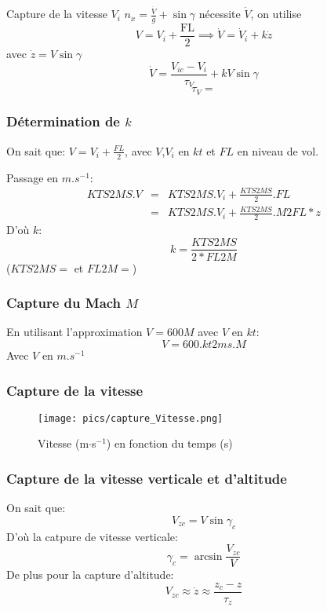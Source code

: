\documentclass[tikz, footheight=2em]{beamer}
\begin{document}
\begin{frame}{Capture de la vitesse \( V_i \)} \pause{}
    \(n_x = \frac{\dot{V}}{g} + \sin \gamma \) \pause{} n\'ecessite \(\dot{V}\),
    on utilise
    \[
    V = V_i + \frac{\text{FL}}{2} \implies \dot{V} = \dot{V}_i + k\dot{z}
    \]
    \pause{}
    avec \( \dot{z} = V\sin \gamma \)
    \[
    \dot{V} = \frac{V_{ic} - V_i}{\tau_V} + kV\sin \gamma
    \]
    \[
    \tau_V =
    \]
\end{frame}

\begin{frame}
    \frametitle{Détermination de \( k \)} \pause{}
    On sait que:
    \(
    V = V_i + \frac{FL}{2}
    \), avec \( V \),\( V_i \) en \( kt \) et \( FL \) en niveau de vol.

    Passage en \( m.s^{-1} \):
    \[
    \begin{array}{rcl}
        KTS2MS . V &=& KTS2MS . V_i + \frac{KTS2MS}{2} . FL\\
        &=& KTS2MS . V_i + \frac{KTS2MS}{2} . M2FL * z
    \end{array}
    \] \pause{}
    D'où \( k \):
    \[
    \boxed{
        k = \frac{KTS2MS}{2*FL2M}
    }
    \]
    (\( KTS2MS = \) et \( FL2M = \))

\end{frame}

\begin{frame}
    \frametitle{Capture du Mach \( M \)} \pause{}
    En utilisant l'approximation \( V = 600 M \) avec \( V \) en \( kt \):
    \[
    \boxed{
        V = 600 . kt2ms . M
    }
    \]
    Avec \( V \) en \( m.s^{-1} \)
\end{frame}

\begin{frame}
	\frametitle{Capture de la vitesse}
	\begin{figure}
		\center
		\texttt{[image: pics/capture\_Vitesse.png]}
		\caption{Vitesse (m\(\cdot\)s\(^{-1}\)) en fonction du temps (s)}
	\end{figure}
\end{frame}


\begin{frame}
    \frametitle{Capture de la vitesse verticale et d'altitude } \pause{}
    On sait que:
    \[
    V_{zc} = V \sin \gamma_{c}
    \] \pause{}
    D'où la catpure de vitesse verticale:
    \[
    \gamma _c = \arcsin \frac{V_{zc}}{V}
    \] \pause{}
    De plus pour la capture d'altitude:
    \[
    V_{zc} \approx \dot{z}  \approx \frac{z_c - z}{\tau_z}
    \]
\end{frame}
\end{document}
